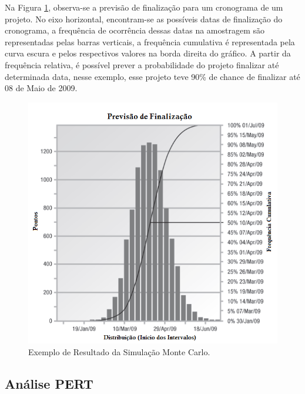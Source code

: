 Na Figura \ref{fig:montecarlo}, observa-se a previsão de finalização para um cronograma de um projeto. No eixo horizontal, encontram-se as possíveis datas de finalização do cronograma, a frequência de ocorrência dessas datas na amostragem são representadas pelas barras verticais, a frequência cumulativa é representada pela curva escura e pelos respectivos valores na borda direita do gráfico. A partir da frequência relativa, é possível prever a probabilidade do projeto finalizar até determinada data, nesse exemplo, esse projeto teve 90\% de chance de finalizar até 08 de Maio de 2009.

\begin{figure}[h]
	\centering
	\includegraphics[width=.6\textwidth]{image/montecarlo.png}
	\caption{Exemplo de Resultado da Simulação Monte Carlo.}
	\label{fig:montecarlo}
\end{figure}

\subsection{Análise PERT}

